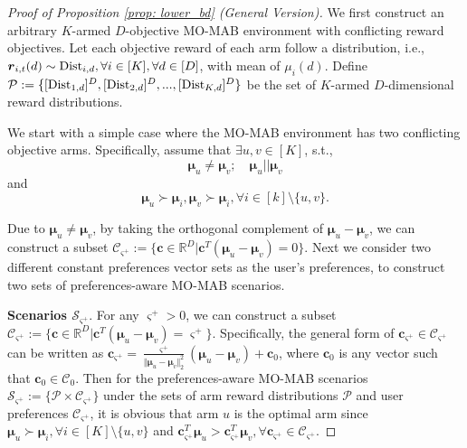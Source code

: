 \begin{proof}[Proof of Proposition \ref{prop: lower_bd} (General Version)]  
We first construct an arbitrary $K$-armed $D$-objective MO-MAB environment with conflicting reward objectives. 
Let each objective reward of each arm follow a distribution, i.e., $\boldsymbol{r}_{i,t}(d) \sim {\rm Dist}_{i,d}, \forall i \in [K], \forall d \in [D]$, with mean of $\mu_i(d)$.
Define $\mathcal{P} := \{ [{\rm Dist}_{1,d}]^D, [{\rm Dist}_{2,d}]^D, ..., [{\rm Dist}_{K,d}]^D  \} $ be the set of $K$-armed $D$-dimensional reward distributions.

We start with a simple case where the MO-MAB environment has two conflicting objective arms. 
Specifically, assume that $\exists u,v \in [K]$, s.t., 
\[
\boldsymbol{\mu}_{u} \neq \boldsymbol{\mu}_{v}; 
\quad \boldsymbol{\mu}_{u} || \boldsymbol{\mu}_{v}
\]
and 
\[
\boldsymbol{\mu}_{u} \succ \boldsymbol{\mu}_{i}, \boldsymbol{\mu}_{v} \succ \boldsymbol{\mu}_{i}, \forall i \in [k] \setminus \{u, v\}.
\]


Due to $\boldsymbol{\mu}_{u} \neq \boldsymbol{\mu}_{v}$, by taking the orthogonal complement of $\boldsymbol{\mu}_{u} - \boldsymbol{\mu}_{v}$, we can construct a subset $\mathcal{C}_{\varsigma^{+}} := \{ \boldsymbol{c} \in \mathbb{R}^D | \boldsymbol{c}^T ( \boldsymbol{\mu}_{u} - \boldsymbol{\mu}_{v} ) = 0 \}$.
Next we consider two different constant preferences vector sets as the user's preferences, to construct two sets of preferences-aware MO-MAB scenarios.

\textbf{Scenarios $\mathcal{S}_{\varsigma^{+}}$}.
For any $\varsigma^{+} > 0$, we can construct a subset $\mathcal{C}_{\varsigma^{+}} := \{ \boldsymbol{c} \in \mathbb{R}^D | \boldsymbol{c}^T ( \boldsymbol{\mu}_{u} - \boldsymbol{\mu}_{v} ) = \varsigma^{+} \}$. Specifically, the general form of $\boldsymbol{c}_{\varsigma^{+}} \in \mathcal{C}_{\varsigma^{+}}$ can be written as $\boldsymbol{c}_{\varsigma^{+}} = \frac{\varsigma^{+}}{ \Vert \boldsymbol{\mu}_{u} - \boldsymbol{\mu}_{v} \Vert_2^2 } (\boldsymbol{\mu}_{u} - \boldsymbol{\mu}_{v}) + \boldsymbol{c}_0$, where $\boldsymbol{c}_0$ is any vector such that $\boldsymbol{c}_0 \in \mathcal{C}_0$.
Then for the preferences-aware MO-MAB scenarios $\mathcal{S}_{\varsigma^{+}} := \{\mathcal{P} \times \mathcal{C}_{\varsigma^{+}} \}$ under the sets of arm reward distributions $\mathcal{P}$ and user preferences $\mathcal{C}_{\varsigma^{+}}$, it is obvious that arm $u$ is the optimal arm since 
$\boldsymbol{\mu}_{u} \succ \boldsymbol{\mu}_{i}, \forall i \in [K] \setminus \{u,v\}$ and $\boldsymbol{c}_{\varsigma^{+}}^T  \boldsymbol{\mu}_{u} > \boldsymbol{c}_{\varsigma^{+}}^T \boldsymbol{\mu}_{v}, \forall \boldsymbol{c}_{\varsigma^{+}} \in \mathcal{C}_{\varsigma^{+}}$.


\end{proof}
